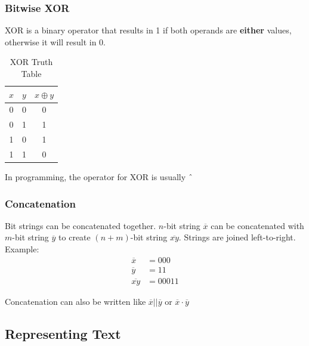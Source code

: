 \documentclass{article}
\begin{document}
\subsubsection{Bitwise XOR}
XOR is a binary operator that results in 1 if both operands are \textbf{either} values,
otherwise it will result in 0.
\begin{table}[h]
    \centering
    \caption{XOR Truth Table}
    \begin{tabular}{c|c|c}
        \(x\) & \(y\) & \(x \oplus y\) \\ \hline
        0     & 0     & 0              \\
        0     & 1     & 1              \\
        1     & 0     & 1              \\
        1     & 1     & 0              \\
    \end{tabular}
\end{table}
\begin{tcolorbox}[title=Note]
    In programming, the operator for XOR is usually \(\string^\)
\end{tcolorbox}
%
\newpage
\subsubsection{Concatenation}
Bit strings can be concatenated together.
\(n\)-bit string \(\overline{x}\) can be concatenated with \(m\)-bit string \(\overline{y}\)
to create \((n + m)\)-bit string \(\overline{xy}\). Strings are joined left-to-right. \\
Example:
\begin{align*}
    \overline{x} &= 000 \\
    \overline{y} &= 11 \\
    \overline{xy} &= 00011
\end{align*}
\begin{tcolorbox}[title=Note]
    Concatenation can also be written like \(\overline{x} \lvert \rvert \overline{y}\)
    or \(\overline{x} \cdot \overline{y}\)
\end{tcolorbox}

\subsection{Representing Text}
\end{document}
